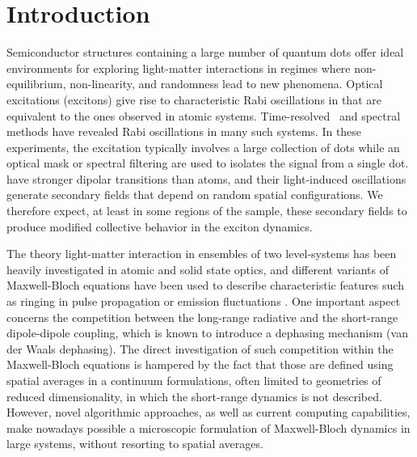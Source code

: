 \section{\label{sec:introduction}Introduction}
Semiconductor structures containing a large number of quantum dots offer ideal environments for exploring light-matter interactions in regimes where non-equilibrium, non-linearity, and randomness lead to new phenomena.
Optical excitations (excitons) give rise to characteristic Rabi oscillations in \qds{} that are equivalent to the ones observed in atomic systems.
Time-resolved~\cite{stievater,shih} and spectral~\cite{kamada} methods have revealed Rabi oscillations in many such systems.
In these experiments, the excitation typically involves a large collection of dots while an optical mask or spectral filtering are used to isolates the signal from a single dot. 
\Qds{} have stronger dipolar transitions than atoms, and their light-induced oscillations generate  secondary fields that depend on random spatial configurations. We therefore expect, at least in some regions of the sample, these secondary fields to produce modified collective behavior in the exciton dynamics.

The theory light-matter interaction in ensembles of two level-systems has been heavily investigated in atomic and solid state optics, and different variants of Maxwell-Bloch equations \cite{Gross1982} have been used to describe characteristic features such as ringing in pulse propagation \cite{Burnham-Chiao PR 188 667 1969,MacGillivray1976} or emission fluctuations \cite{Haake1979}. One important aspect concerns the competition between the long-range radiative and the short-range dipole-dipole coupling\cite{coffey1978}, which is known to introduce a dephasing mechanism (van der Waals dephasing\cite{gross1982}). The direct investigation of such competition within the Maxwell-Bloch equations is hampered by the fact that those are defined using spatial averages in a continuum formulations, often limited to geometries of reduced dimensionality, in which the short-range dynamics is not described. However, novel algorithmic approaches, as well as current computing capabilities, make nowadays possible a microscopic formulation of Maxwell-Bloch dynamics in large systems, without resorting to spatial averages.

